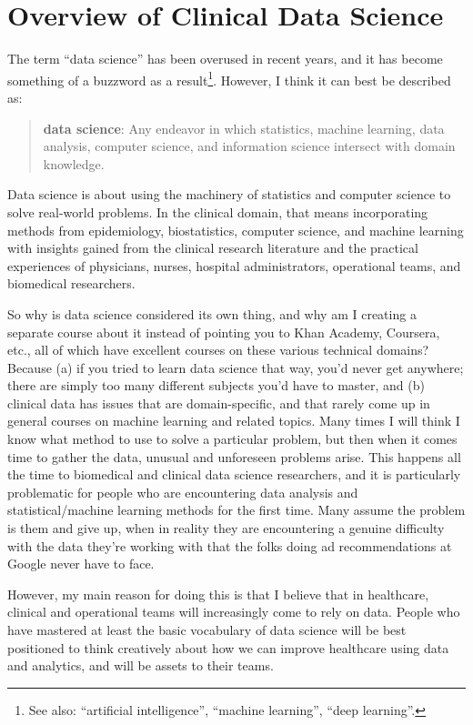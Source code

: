 \chapter{Overview of Clinical Data Science \label{chapter:overview}}

The term ``data science'' has been overused in recent years, and it has become something of a buzzword as a result\footnote{See also: ``artificial intelligence'', ``machine learning'', ``deep learning''.}. However, I think it can best be described as: 
\begin{quote}
\textbf{data science}: Any endeavor in which statistics, machine learning, data analysis, computer science, and information science intersect with domain knowledge.
\end{quote}
Data science is about using the machinery of statistics and computer science to solve real-world problems. In the clinical domain, that means incorporating methods from epidemiology, biostatistics, computer science, and machine learning with insights gained from the clinical research literature and the practical experiences of physicians, nurses, hospital administrators, operational teams, and biomedical researchers.

So why is data science considered its own thing, and why am I creating a separate course about it instead of pointing you to Khan Academy, Coursera, etc., all of which have excellent courses on these various technical domains? Because (a) if you tried to learn data science that way, you'd never get anywhere; there are simply too many different subjects you'd have to master, and (b) clinical data has issues that are domain-specific, and that rarely come up in general courses on machine learning and related topics. Many times I will think I know what method to use to solve a particular problem, but then when it comes time to gather the data, unusual and unforeseen problems arise. This happens all the time to biomedical and clinical data science researchers, and it is particularly problematic for people who are encountering data analysis and statistical/machine learning methods for the first time. Many assume the problem is them and give up, when in reality they are encountering a genuine difficulty with the data they're working with that the folks doing ad recommendations at Google never have to face.

However, my main reason for doing this is that I believe that in healthcare, clinical and operational teams will increasingly come to rely on data. People who have mastered at least the basic vocabulary of data science will be best positioned to think creatively about how we can improve healthcare using data and analytics, and will be assets to their teams. 

